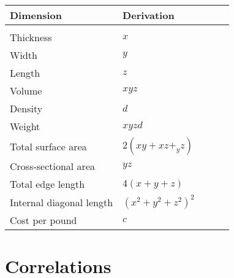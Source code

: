 \documentclass[
]{book}
\begin{document}
\begin{table}[]
\begin{tabular}{lllll}
 Dimension &  Derivation  &  \\
 \hline \\
 Thickness &  $x$  \\
 Width & $y$ \\
 Length & $z$ \\
 Volume & $xyz$ \\
 Density & $d$ \\
 Weight & $xyzd$ \\
 Total surface area & $2(xy + xz +_ yz)$ \\
 Cross-sectional area & $yz$ \\
 Total edge length & $4(x +  y + z)$ \\
 Internal diagonal length & $(x^2 + y^2 + z^2)^2$ \\
 Cost per pound & $c$
\end{tabular}
\end{table}

\hypertarget{correlations}{%
\section{Correlations}\label{correlations}}
\end{document}
